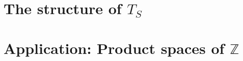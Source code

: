 \documentclass[12pt, glossary]{dalthesis}
\theoremstyle{plain}
\theoremstyle{definition}
\begin{document}
\chapter{The structure of $T_S$}

\chapter{Application: Product spaces of $\mathbb{Z}$}

%
%
%
\end{document}
